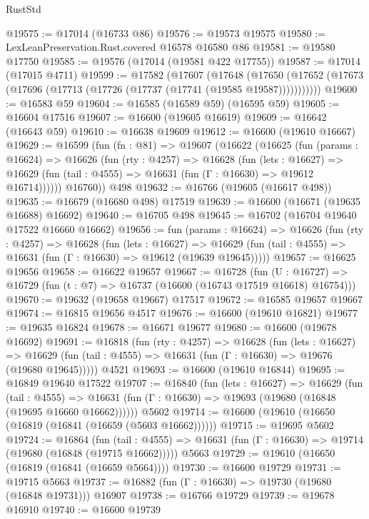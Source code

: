 \begin{lexlean}{RustStd}
\begin{coremodule}
@19575 := @17014 (@16733 @86)
@19576 := @19573 @19575
@19580 := LexLeanPreservation.Rust.covered @16578 @16580 @86
@19581 := @19580 @17750
@19585 := @19576 (@17014 (@19581 @422 @17755))
@19587 := @17014 (@17015 @4711)
@19599 := @17582
    (@17607
      (@17648
        (@17650 (@17652 (@17673 (@17696 (@17713 (@17726 (@17737 (@17741 (@19585 @19587)))))))))))
@19600 := @16583 @59
@19604 := @16585 (@16589 @59) (@16595 @59)
@19605 := @16604 @17516
@19607 := @16600 (@19605 @16619)
@19609 := @16642 (@16643 @59)
@19610 := @16638 @19609
@19612 := @16600 (@19610 @16667)
@19629 := @16599
    (fun (fn : @81) =>
    @19607
      (@16622
        (@16625
          (fun (params : @16624) =>
          @16626
            (fun (rty : @4257) =>
            @16628
              (fun (lets : @16627) =>
              @16629 (fun (tail : @4555) => @16631 (fun (Γ : @16630) => @19612 @16714))))))
        @16760))
    @498
@19632 := @16766 (@19605 (@16617 @498))
@19635 := @16679 (@16680 @498) @17519
@19639 := @16600 (@16671 (@19635 @16688) @16692)
@19640 := @16705 @498
@19645 := @16702 (@16704 @19640 @17522 @16660 @16662)
@19656 := fun (params : @16624) =>
  @16626
    (fun (rty : @4257) =>
    @16628
      (fun (lets : @16627) =>
      @16629 (fun (tail : @4555) => @16631 (fun (Γ : @16630) => @19612 (@19639 @19645)))))
@19657 := @16625 @19656
@19658 := @16622 @19657
@19667 := @16728
    (fun (U : @16727) => @16729 (fun (t : @7) => @16737 (@16600 (@16743 @17519 @16618) @16754)))
@19670 := @19632 (@19658 @19667) @17517
@19672 := @16585 @19657 @19667
@19674 := @16815 @19656 @4517
@19676 := @16600 (@19610 @16821)
@19677 := @19635 @16824
@19678 := @16671 @19677
@19680 := @16600 (@19678 @16692)
@19691 := @16818
    (fun (rty : @4257) =>
    @16628
      (fun (lets : @16627) =>
      @16629 (fun (tail : @4555) => @16631 (fun (Γ : @16630) => @19676 (@19680 @19645)))))
    @4521
@19693 := @16600 (@19610 @16844)
@19695 := @16849 @19640 @17522
@19707 := @16840
    (fun (lets : @16627) =>
    @16629
      (fun (tail : @4555) =>
      @16631 (fun (Γ : @16630) => @19693 (@19680 (@16848 (@19695 @16660 @16662))))))
    @5602
@19714 := @16600 (@19610 (@16650 (@16819 (@16841 (@16659 (@5603 @16662))))))
@19715 := @19695 @5602
@19724 := @16864
    (fun (tail : @4555) => @16631 (fun (Γ : @16630) => @19714 (@19680 (@16848 (@19715 @16662)))))
    @5663
@19729 := @19610 (@16650 (@16819 (@16841 (@16659 @5664))))
@19730 := @16600 @19729
@19731 := @19715 @5663
@19737 := @16882 (fun (Γ : @16630) => @19730 (@19680 (@16848 @19731))) @16907
@19738 := @16766 @19729
@19739 := @19678 @16910
@19740 := @16600 @19739

\end{coremodule}
\end{lexlean}

